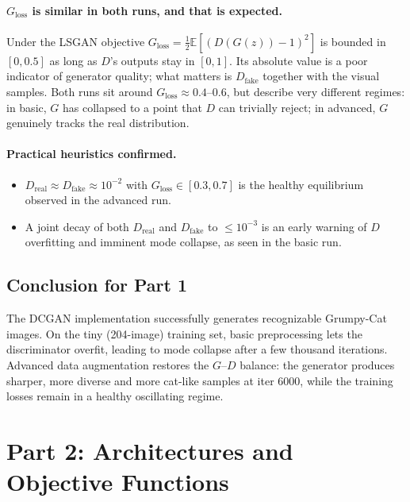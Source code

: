 \documentclass[11pt]{article}
\begin{document}
\paragraph{$G_\text{loss}$ is similar in both runs, and that is expected.}
Under the LSGAN objective $G_\text{loss}=\tfrac12\mathbb{E}[(D(G(z))-1)^2]$
is bounded in $[0, 0.5]$ as long as $D$'s outputs stay in $[0, 1]$. Its
absolute value is a poor indicator of generator quality; what matters is
$D_\text{fake}$ together with the visual samples. Both runs sit around
$G_\text{loss}\approx 0.4\text{--}0.6$, but describe very different
regimes: in basic, $G$ has collapsed to a point that $D$ can trivially reject;
in advanced, $G$ genuinely tracks the real distribution.

\paragraph{Practical heuristics confirmed.}
\begin{itemize}
    \item $D_\text{real}\approx D_\text{fake}\approx 10^{-2}$ with
    $G_\text{loss}\in[0.3,0.7]$ is the healthy equilibrium observed in the
    advanced run.
    \item A joint decay of both $D_\text{real}$ and $D_\text{fake}$ to
    $\leq 10^{-3}$ is an early warning of $D$ overfitting and imminent mode
    collapse, as seen in the basic run.
\end{itemize}

\subsection{Conclusion for Part 1}
The DCGAN implementation successfully generates recognizable Grumpy-Cat
images. On the tiny (204-image) training set, basic preprocessing lets the
discriminator overfit, leading to mode collapse after a few thousand
iterations. Advanced data augmentation restores the $G$–$D$ balance: the
generator produces sharper, more diverse and more cat-like samples at iter
6000, while the training losses remain in a healthy oscillating regime.


\section{Part 2: Architectures and Objective Functions}
\end{document}
